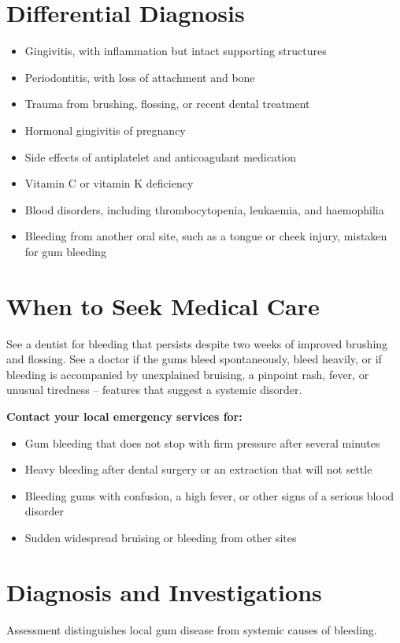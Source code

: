 \section*{Differential Diagnosis}
\begin{itemize}
    \item Gingivitis, with inflammation but intact supporting structures
    \item Periodontitis, with loss of attachment and bone
    \item Trauma from brushing, flossing, or recent dental treatment
    \item Hormonal gingivitis of pregnancy
    \item Side effects of antiplatelet and anticoagulant medication
    \item Vitamin C or vitamin K deficiency
    \item Blood disorders, including thrombocytopenia, leukaemia, and haemophilia
    \item Bleeding from another oral site, such as a tongue or cheek injury, mistaken for gum bleeding
\end{itemize}

\section*{When to Seek Medical Care}
See a dentist for bleeding that persists despite two weeks of improved brushing and flossing. See a doctor if the gums bleed spontaneously, bleed heavily, or if bleeding is accompanied by unexplained bruising, a pinpoint rash, fever, or unusual tiredness -- features that suggest a systemic disorder.

\textbf{Contact your local emergency services for:}
\begin{itemize}
    \item Gum bleeding that does not stop with firm pressure after several minutes
    \item Heavy bleeding after dental surgery or an extraction that will not settle
    \item Bleeding gums with confusion, a high fever, or other signs of a serious blood disorder
    \item Sudden widespread bruising or bleeding from other sites
\end{itemize}

\section*{Diagnosis and Investigations}
Assessment distinguishes local gum disease from systemic causes of bleeding.

